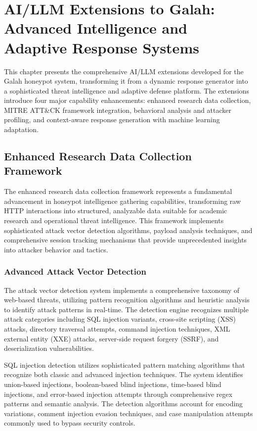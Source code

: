 \chapter{AI/LLM Extensions to Galah: Advanced Intelligence and Adaptive Response Systems}

This chapter presents the comprehensive AI/LLM extensions developed for the Galah honeypot system, transforming it from a dynamic response generator into a sophisticated threat intelligence and adaptive defense platform. The extensions introduce four major capability enhancements: enhanced research data collection, MITRE ATT\&CK framework integration, behavioral analysis and attacker profiling, and context-aware response generation with machine learning adaptation.

\section{Enhanced Research Data Collection Framework}

The enhanced research data collection framework represents a fundamental advancement in honeypot intelligence gathering capabilities, transforming raw HTTP interactions into structured, analyzable data suitable for academic research and operational threat intelligence. This framework implements sophisticated attack vector detection algorithms, payload analysis techniques, and comprehensive session tracking mechanisms that provide unprecedented insights into attacker behavior and tactics.

\subsection{Advanced Attack Vector Detection}

The attack vector detection system implements a comprehensive taxonomy of web-based threats, utilizing pattern recognition algorithms and heuristic analysis to identify attack patterns in real-time. The detection engine recognizes multiple attack categories including SQL injection variants, cross-site scripting (XSS) attacks, directory traversal attempts, command injection techniques, XML external entity (XXE) attacks, server-side request forgery (SSRF), and deserialization vulnerabilities.

SQL injection detection utilizes sophisticated pattern matching algorithms that recognize both classic and advanced injection techniques. The system identifies union-based injections, boolean-based blind injections, time-based blind injections, and error-based injection attempts through comprehensive regex patterns and semantic analysis. The detection algorithms account for encoding variations, comment injection evasion techniques, and case manipulation attempts commonly used to bypass security controls.

